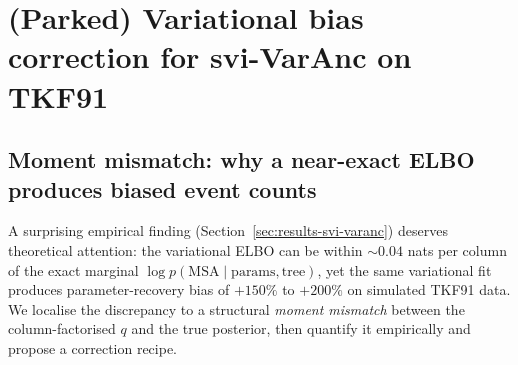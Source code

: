 %
%
%

\section{(Parked) Variational bias correction for svi-VarAnc on TKF91}
\label{app:varanc-bias-correction-pending}

\subsection{Moment mismatch: why a near-exact ELBO produces biased
event counts}
\label{sec:moment-mismatch-pending}

A surprising empirical finding (Section~\ref{sec:results-svi-varanc})
deserves theoretical attention: the variational ELBO can be within
$\sim 0.04$ nats per column of the exact marginal $\log p(\text{MSA}
\mid \text{params}, \text{tree})$, yet the same variational fit
produces parameter-recovery bias of $+150\%$ to $+200\%$ on
simulated TKF91 data.  We localise the discrepancy to a structural
\emph{moment mismatch} between the column-factorised $q$ and the
true posterior, then quantify it empirically and propose a
correction recipe.

